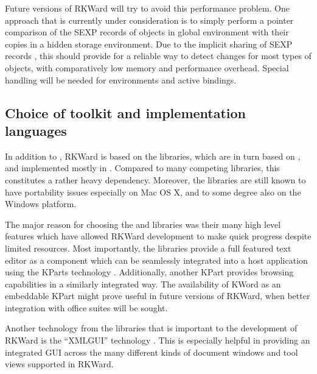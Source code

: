 Future versions of RKWard will try to avoid this performance problem. 
One approach that is currently under consideration is to simply perform
a pointer comparison of the SEXP records of objects in global environment with
their copies in a hidden storage environment. Due to the implicit sharing of
SEXP records \citep{RDCT2010a, RDCT2010b}, this should provide for a reliable
way to detect changes for most types of  objects, with comparatively low memory
and performance overhead. Special handling will be needed for environments and
active bindings.

\subsection{Choice of toolkit and implementation languages}
\label{sec:technical_toolkit}
In addition to , RKWard is based on the  libraries, which are in turn based
on , and implemented mostly in . Compared to many competing libraries,
this constitutes a rather heavy dependency. Moreover, the  libraries are
still known to have portability issues especially on Mac OS X, and to some degree
also on the Windows platform.

The major reason for choosing the  and  libraries was their 
many high level features which have allowed RKWard development to make quick
progress despite limited resources. Most importantly, the  libraries provide a
full featured text editor \citep{CullmannND} as a component which can be
seamlessly integrated into a host application using the KParts technology
\citep{Faure2000}. Additionally, another KPart provides  browsing capabilities in a
similarly integrated way. The availability of KWord \citep{KWord} as an
embeddable KPart might prove useful in future versions of RKWard, when better
integration with office suites will be sought.

Another technology from the  libraries that is important to the development
of RKWard is the ``XMLGUI'' technology
\citep{Faure2000}. This is especially helpful in providing an integrated GUI across
the many different kinds of document windows and tool views supported in RKWard.

